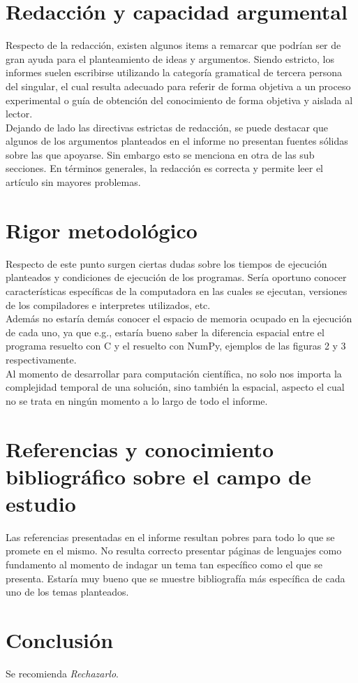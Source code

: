 \documentclass[osajnl,twocolumn,showpacs,superscriptaddress,10pt]{revtex4-1} %
\begin{document}
\section{Redacción y capacidad argumental}

Respecto de la redacción, existen algunos items a remarcar que podrían ser de gran ayuda para el planteamiento de ideas y argumentos. Siendo estricto, los informes suelen escribirse utilizando la categoría gramatical de tercera persona del singular, el cual resulta adecuado para referir de forma objetiva a un proceso experimental o guía de obtención del conocimiento de forma objetiva y aislada al lector. \\

Dejando de lado las directivas estrictas de redacción, se puede destacar que algunos de los argumentos planteados en el informe no presentan fuentes sólidas sobre las que apoyarse. Sin embargo esto se menciona en otra de las sub secciones. En términos generales, la redacción es correcta y permite leer el artículo sin mayores problemas. \\

\section{Rigor metodológico}

Respecto de este punto surgen ciertas dudas sobre los tiempos de ejecución planteados y condiciones de ejecución de los programas. Sería oportuno conocer características específicas de la computadora en las cuales se ejecutan, versiones de los compiladores e interpretes utilizados, etc. \\

Además no estaría demás conocer el espacio de memoria ocupado en la ejecución de cada uno, ya que e.g., estaría bueno saber la diferencia espacial entre el programa resuelto con C y el resuelto con NumPy, ejemplos de las figuras 2 y 3 respectivamente. \\

Al momento de desarrollar para computación científica, no solo nos importa la complejidad temporal de una solución, sino también la espacial, aspecto el cual no se trata en ningún momento a lo largo de todo el informe. \\

\section{Referencias y conocimiento bibliográfico sobre el campo de estudio}

Las referencias presentadas en el informe resultan pobres para todo lo que se promete en el mismo. No resulta correcto presentar páginas de lenguajes como fundamento al momento de indagar un tema tan específico como el que se presenta. Estaría muy bueno que se muestre bibliografía más específica de cada uno de los temas planteados. \\

\section{Conclusión}

Se recomienda \textit{Rechazarlo}. \\
\end{document}
